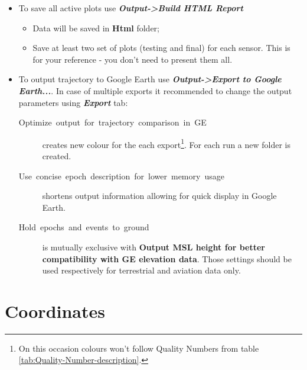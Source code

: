 \documentclass[11pt,fleqn]{book} %
\begin{document}
\begin{itemize}
	\item To save all active plots use\textbf{\emph{ Output->Build HTML Report }}
	\begin{itemize}
		\item Data will be saved in \textbf{Html} folder;
		\item Save at least two set of plots (testing and final) for each sensor. This is for your reference - you don't need to present them all.
	\end{itemize}
	\item To output trajectory to Google Earth use\textbf{\emph{ Output->Export to Google Earth...}}. In case of multiple exports it recommended to change the output parameters using \textbf{\emph{Export}} tab:
	\begin{description}
		\item [{Optimize~output~for~trajectory~comparison~in~GE}] creates new colour for the each export\footnote{On this occasion colours won't follow Quality Numbers from table \ref{tab:Quality-Number-description}.}. For each run a new folder is created.
		\item [{Use~concise~epoch~description~for~lower~memory~usage}] shortens output information allowing for quick display in Google Earth.
		\item [Hold~epochs~and~events~to~ground] is mutually exclusive with \textbf{Output MSL height for better compatibility with GE elevation data}. Those settings should be used respectively for terrestrial and aviation data only.
	\end{description}
\end{itemize}





\section{Coordinates}


\end{document}
